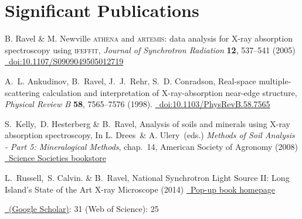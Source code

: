 \documentclass[11pt]{moderncv}
\begin{document}
\section{Significant Publications}
\label{sec:highlights}

%
{\small B. Ravel \& M. Newville \textsc{athena} and
  \textsc{artemis}: data analysis for X-ray absorption spectroscopy
  using \textsc{ifeffit}, \emph{Journal of Synchrotron Radiation}
  \textbf{12}, 537--541 (2005)
  \href{https://doi.org/10.1107/S0909049505012719}
  {\color{color2}\homepagesymbol~doi:10.1107/S0909049505012719}}

%
{\small A.~L. Ankudinov,  B.~Ravel,  J.~J.~Rehr,  S.~D. Conradson,
  Real-space multiple-scattering calculation and interpretation of
  X-ray-absorption near-edge structure, \emph{Physical Review B}
  \textbf{58}, 7565--7576 (1998).
  \href{https://doi.org/10.1103/PhysRevB.58.7565}
  {\color{color2}\homepagesymbol~doi:10.1103/PhysRevB.58.7565}}

%
{\small S.\ Kelly,\ D. Hesterberg \& B.\ Ravel, Analysis of soils and
  minerals using X-ray absorption spectroscopy, In L. Drees\ \&
  A. Ulery\ (eds.)  \emph{Methods of Soil Analysis - Part 5:
    Mineralogical Methods}, chap.~14, American Society of Agronomy
  (2008)
  \href{https://portal.sciencesocieties.org/Purchase/ProductDetail.aspx?Product_code=802f0511-76f0-dc11-b6b8-0013210e308c}
  {\color{color2}\homepagesymbol~Science Societies bookstore}}

%
{\small L.\ Russell,\ S. Calvin. \& B.\ Ravel, National Synchrotron
  Light Source II: Long Island's State of the Art X-ray Microscope
  (2014)
  \href{http://bruceravel.github.io/synchrotron_pop_up_book/}
  {\color{color2}\homepagesymbol~Pop-up book homepage}}

%
{\small \href{http://scholar.google.com/citations?user=41rV5koAAAAJ}
  {\color{color2}\homepagesymbol~(Google Scholar)}: 31 \qquad
  (Web of Science): 25}
\fi

\nocite{*}


\end{document}
